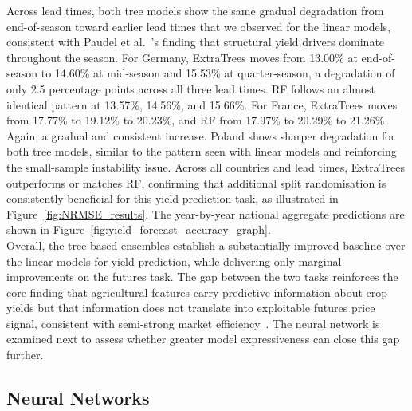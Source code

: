 \documentclass[pdflatex,sn-mathphys-num, oneside, 11pt]{sn-jnl}%
\theoremstyle{thmstyleone}%
\theoremstyle{thmstyletwo}%
\theoremstyle{thmstylethree}%
\begin{document}
Across lead times, both tree models show the same gradual degradation from end-of-season toward earlier lead times that we observed for the linear models, consistent with Paudel et al.~\cite{bib16}'s finding that structural yield drivers dominate throughout the season. For Germany, ExtraTrees moves from 13.00\% at end-of-season to 14.60\% at mid-season and 15.53\% at quarter-season, a degradation of only 2.5 percentage points across all three lead times. RF follows an almost identical pattern at 13.57\%, 14.56\%, and 15.66\%. For France, ExtraTrees moves from 17.77\% to 19.12\% to 20.23\%, and RF from 17.97\% to 20.29\% to 21.26\%. Again, a gradual and consistent increase. Poland shows sharper degradation for both tree models, similar to the pattern seen with linear models and reinforcing the small-sample instability issue. Across all countries and lead times, ExtraTrees outperforms or matches RF, confirming that additional split randomisation is consistently beneficial for this yield prediction task, as illustrated in Figure~\ref{fig:NRMSE_results}. The year-by-year national aggregate predictions are shown in Figure~\ref{fig:yield_forecast_accuracy_graph}.\\

Overall, the tree-based ensembles establish a substantially improved baseline over the linear models for yield prediction, while delivering only marginal improvements on the futures task. The gap between the two tasks reinforces the core finding that agricultural features carry predictive information about crop yields but that information does not translate into exploitable futures price signal, consistent with semi-strong market efficiency~\cite{bib30}. The neural network is examined next to assess whether greater model expressiveness can close this gap further.

\subsection{Neural Networks}\label{sec:neuralnets}
\end{document}

